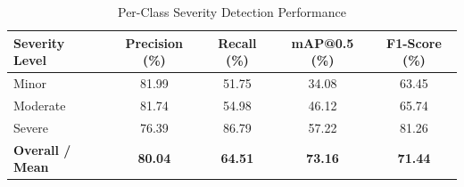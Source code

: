 \begin{table}[h]
\centering
\caption{Per-Class Severity Detection Performance}
\label{tab:per_class_severity}
\begin{tabular}{lcccc}
\hline
\textbf{Severity Level} & \textbf{Precision (\%)} & \textbf{Recall (\%)} & \textbf{mAP@0.5 (\%)} & \textbf{F1-Score (\%)} \\
\hline
Minor & 81.99 & 51.75 & 34.08 & 63.45 \\
Moderate & 81.74 & 54.98 & 46.12 & 65.74 \\
Severe & 76.39 & 86.79 & 57.22 & 81.26 \\
\hline
\textbf{Overall / Mean} & \textbf{80.04} & \textbf{64.51} & \textbf{73.16} & \textbf{71.44} \\
\hline
\end{tabular}
\end{table}
